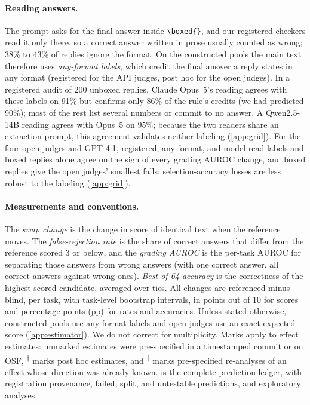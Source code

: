 \documentclass{article}
\newcommand{\reana}{\textsuperscript{$\ddagger$}}
\newcommand{\ph}{\textsuperscript{$\dagger$}}
\begin{document}
\paragraph{Reading answers.}
The prompt asks for the final answer inside \texttt{\textbackslash boxed\{\}}, and our registered checkers read it only there, so a correct answer written in prose usually counted as wrong; 38\% to 43\% of replies ignore the format.
On the constructed pools the main text therefore uses \emph{any-format labels}, which credit the final answer a reply states in any format (registered for the API judges, post hoc for the open judges). In a registered audit of 200 unboxed replies, Claude Opus~5's reading agrees with these labels on 91\% but confirms only 86\% of the rule's credits (we had predicted 90\%); most of the rest list several numbers or commit to no answer. A Qwen2.5-14B reading agrees with Opus~5 on 95\%; because the two readers share an extraction prompt, this agreement validates neither labeling (\cref{app:grid}). For the four open judges and GPT-4.1, registered, any-format, and model-read labels and boxed replies alone agree on the sign of every grading AUROC change, and boxed replies give the open judges' smallest falls; selection-accuracy losses are less robust to the labeling (\cref{app:grid}).

\paragraph{Measurements and conventions.}
The \emph{swap change} is the change in score of identical text when the reference moves. The \emph{false-rejection rate} is the share of correct answers that differ from the reference scored 3 or below, and the \emph{grading AUROC} is the per-task AUROC for separating those answers from wrong answers (with one correct answer, all correct answers against wrong ones). \emph{Best-of-64 accuracy} is the correctness of the highest-scored candidate, averaged over ties. All changes are referenced minus blind, per task, with task-level bootstrap intervals, in points out of 10 for scores and percentage points (pp) for rates and accuracies. Unless stated otherwise, constructed pools use any-format labels and open judges use an exact expected score (\cref{app:estimator}). We do not correct for multiplicity.
Marks apply to effect estimates: unmarked estimates were pre-specified in a timestamped commit or on OSF, \ph{} marks post hoc estimates, and \reana{} marks pre-specified re-analyses of an effect whose direction was already known.  is the complete prediction ledger, with registration provenance, failed, split, and untestable predictions, and exploratory analyses.
\end{document}
